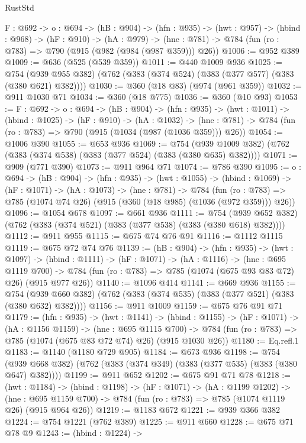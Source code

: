 \begin{lexlean}{RustStd}
\begin{coremodule}
{\begin{coremodule}
  {F : @692} ->
  {o : @694} ->
  (hB : @904) ->
  (hfn : @935) ->
  (hwt : @957) ->
  (hbind : @968) ->
  (hF : @910) ->
  (hA : @979) -> (hne : @781) -> @784 (fun (ro : @783) => @790 (@915 (@982 (@984 (@987 @359))) @26))
@1006 := @952 @389
@1009 := @636 (@525 (@539 @359))
@1011 := @440 @1009 @936
@1025 := @754 (@939 @955 @382) (@762 (@383 (@374 @524) (@383 (@377 @577) (@383 (@380 @621) @382))))
@1030 := @360 (@18 @83) (@974 (@961 @359))
@1032 := @911 @1030 @71
@1034 := @360 (@18 @775)
@1036 := @360 (@10 @93)
@1053 := {F : @692} ->
  {o : @694} ->
  (hB : @904) ->
  (hfn : @935) ->
  (hwt : @1011) ->
  (hbind : @1025) ->
  (hF : @910) ->
  (hA : @1032) ->
  (hne : @781) -> @784 (fun (ro : @783) => @790 (@915 (@1034 (@987 (@1036 @359))) @26))
@1054 := @1006 @390
@1055 := @653 @936
@1069 := @754 (@939 @1009 @382) (@762 (@383 (@374 @538) (@383 (@377 @524) (@383 (@380 @635) @382))))
@1071 := @909 (@771 @390)
@1073 := @911 @964 @71
@1074 := @786 @390
@1095 := {o : @694} ->
  (hB : @904) ->
  (hfn : @935) ->
  (hwt : @1055) ->
  (hbind : @1069) ->
  (hF : @1071) ->
  (hA : @1073) ->
  (hne : @781) ->
  @784 (fun (ro : @783) => @785 (@1074 @74 @26) (@915 (@360 (@18 @985) (@1036 (@972 @359))) @26))
@1096 := @1054 @678
@1097 := @661 @936
@1111 := @754 (@939 @652 @382) (@762 (@383 (@374 @521) (@383 (@377 @538) (@383 (@380 @618) @382))))
@1112 := @911 @955
@1115 := @675 @74 @76 @91
@1116 := @1112 @1115
@1119 := @675 @72 @74 @76
@1139 := (hB : @904) ->
  (hfn : @935) ->
  (hwt : @1097) ->
  (hbind : @1111) ->
  (hF : @1071) ->
  (hA : @1116) ->
  (hne : @695 @1119 @700) ->
  @784 (fun (ro : @783) => @785 (@1074 (@675 @93 @83 @72) @26) (@915 @977 @26))
@1140 := @1096 @414
@1141 := @669 @936
@1155 := @754 (@939 @660 @382) (@762 (@383 (@374 @535) (@383 (@377 @521) (@383 (@380 @632) @382))))
@1156 := @911 @1009
@1159 := @675 @76 @91 @71
@1179 := (hfn : @935) ->
  (hwt : @1141) ->
  (hbind : @1155) ->
  (hF : @1071) ->
  (hA : @1156 @1159) ->
  (hne : @695 @1115 @700) ->
  @784 (fun (ro : @783) => @785 (@1074 (@675 @83 @72 @74) @26) (@915 @1030 @26))
@1180 := Eq.refl.{1}
@1183 := @1140 (@1180 @729 @905)
@1184 := @673 @936
@1198 := @754 (@939 @668 @382) (@762 (@383 (@374 @349) (@383 (@377 @535) (@383 (@380 @647) @382))))
@1199 := @911 @652
@1202 := @675 @91 @71 @78
@1218 := (hwt : @1184) ->
  (hbind : @1198) ->
  (hF : @1071) ->
  (hA : @1199 @1202) ->
  (hne : @695 @1159 @700) -> @784 (fun (ro : @783) => @785 (@1074 @1119 @26) (@915 @964 @26))
@1219 := @1183 @672
@1221 := @939 @366 @382
@1224 := @754 @1221 (@762 @389)
@1225 := @911 @660
@1228 := @675 @71 @78 @9
@1243 := (hbind : @1224) ->

\end{coremodule}}
\end{coremodule}
\end{lexlean}
